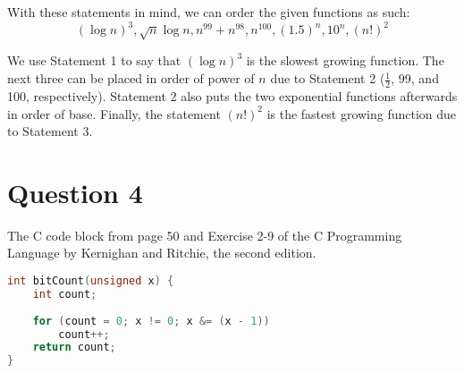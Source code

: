 \documentclass[letterpaper, 12pt]{article}
\begin{document}
With these statements in mind, we can order the given functions as such:
\[(\log{n})^3, \sqrt{n}\log{n}, n^{99} + n^{98}, n^{100}, (1.5)^n, 10^n, (n!)^2\]

We use Statement 1 to say that $(\log{n})^3$ is the slowest growing function. The next three can be placed in order of power of $n$ due to Statement 2 ($\frac{1}{2}$, 99, and 100, respectively). Statement 2 also puts the two exponential functions afterwards in order of base. Finally, the statement $(n!)^2$ is the fastest growing function due to Statement 3.

\section*{Question 4}
The C code block from page 50 and Exercise 2-9 of the C Programming Language by Kernighan and Ritchie, the second edition.

\begin{lstlisting}[language=C]
int bitCount(unsigned x) {
    int count;
    
    for (count = 0; x != 0; x &= (x - 1))
        count++;
    return count;
}
\end{lstlisting}
\end{document}
